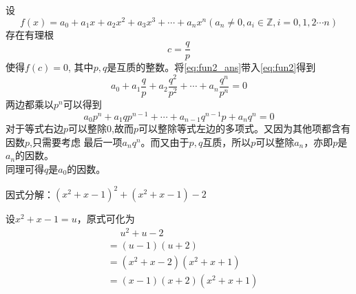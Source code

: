 \documentclass[windows,csize4]{BHCexam}
\begin{document}
\begin{groups}
    设
    \begin{equation}
        \label{eq:fun2}
        f(x)=a_0+a_1 x+a_2 x^2+a_3 x^3 +\cdots +a_n x^n 
        (a_n\neq 0, a_i\in \mathbb{Z}, i=0,1,2\cdots n)
    \end{equation}
    存在有理根
    \begin{equation}
        \label{eq:fun2_ans}
        c=\frac{q}{p}    
    \end{equation}
    使得$f(c)=0$, 其中$p,q$是互质的整数。将\ref{eq:fun2_ans}带入\ref{eq:fun2}得到
    \begin{equation}
        \label{eq:fun3}
        a_0+a_1\frac{q}{p}+a_2\frac{q^2}{p^2}+\cdots +a_n\frac{q^n}{p^n} = 0
    \end{equation}
    两边都乘以$p^n$可以得到
    \begin{equation}
        \label{eq:fun4}
        a_0p^n+a_1qp^{n-1}+\cdots+ a_{n-1}q^{n-1}p + a_nq^n = 0
    \end{equation}
    对于等式右边$p$可以整除$0$,故而$p$可以整除等式左边的多项式。又因为其他项都含有因数$p$,只需要考虑
    最后一项$a_n q^n$。而又由于$p,q$互质，所以$p$可以整除$a_n$，亦即$p$是$a_n$的因数。\\ 
    同理可得$q$是$a_0$的因数。
\end{groups}


\begin{groups}

    \begin{questions}[]
        \question[5]因式分解：$(x^2+x-1)^2+(x^2+x-1)-2$
        \begin{solution}{0.5cm}
            \methodonly 设$x^2+x-1=u$，原式可化为
            \[
                \begin{aligned}
                     & \phantom{=}u^2+u-2   \\
                     & =(u-1)(u+2)          \\
                     & =(x^2+x-2)(x^2+x+1)  \\
                     & =(x-1)(x+2)(x^2+x+1)
                \end{aligned}
            \]
        \end{solution}
        \vspace{4cm}


    \end{questions}
\end{groups}

\label{lastpage}
\end{document}
